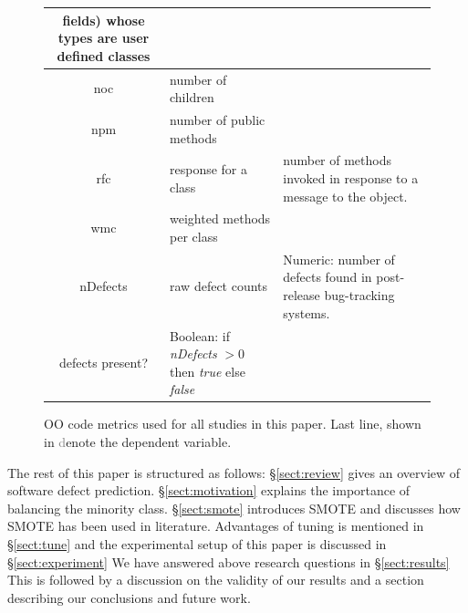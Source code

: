 \documentclass[10pt,conference]{IEEEtran}
\theoremstyle{break}
\theoremstyle{break}
\newcommand{\tion}[1]{{\S}\ref{sect:#1}}
\begin{document}
\begin{figure}[t!]
\begin{center}
{\begin{tabular}{c|l|p{4.0in}}
fields) whose types are user defined classes\\
\hline
noc & number of children &\\
\hline
npm & number of public methods & \\
\hline
rfc & response for a class &number of methods invoked in response to
a message to the object.\\
\hline
wmc & weighted methods per class &\\
\hline
\rowcolor{lightgray}
nDefects & raw defect counts & Numeric: number of defects found in post-release bug-tracking systems.\\
\rowcolor{lightgray}
defects present? & Boolean: if {\em nDefects} $>0$ then {\em true} else {\em false}
\end{tabular}
}
\end{center}
\caption{OO code metrics used for all studies in this paper.
Last line, shown in \textcolor{gray} denote the dependent variable.}
\label{fig:ck}
\vspace{-0.7cm}
\end{figure}



The rest of this paper is structured as follows:
\tion{review} gives an overview of software defect prediction. \tion{motivation} explains the importance of balancing the minority class.
\tion{smote} introduces SMOTE and discusses how SMOTE has been used in literature. Advantages
of tuning is mentioned in \tion{tune}
and the experimental setup of this paper is discussed in \tion{experiment}
We have answered above research questions in
\tion{results} This is followed by a discussion on the validity of our results 
and a section describing our conclusions and future work.


 


\end{document}
